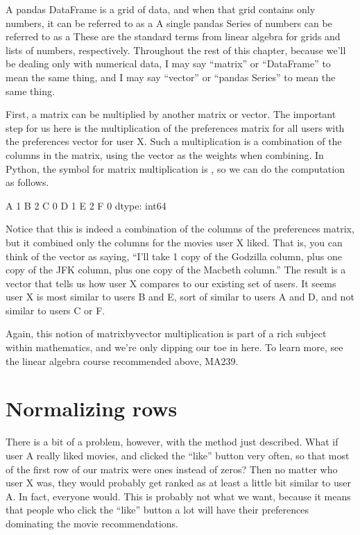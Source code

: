 \documentclass[letterpaper,10pt,english]{sphinxmanual}
\begin{document}
A pandas DataFrame is a grid of data, and when that grid contains only numbers, it can be referred to as a   A single pandas Series of numbers can be referred to as a   These are the standard terms from linear algebra for grids and lists of numbers, respectively.  Throughout the rest of this chapter, because we’ll be dealing only with numerical data, I may say “matrix” or “DataFrame” to mean the same thing, and I may say “vector” or “pandas Series” to mean the same thing.

First, a matrix can be multiplied by another matrix or vector.  The important step for us here is the multiplication of the preferences matrix for all users with the preferences vector for user X.  Such a multiplication is a combination of the columns in the matrix, using the vector as the weights when combining.  In Python, the symbol for matrix multiplication is , so we can do the computation as follows.

\begin{sphinxVerbatim}[commandchars=\\\{\}]
  
\end{sphinxVerbatim}

\begin{sphinxVerbatim}[commandchars=\\\{\}]
A    1
B    2
C    0
D    1
E    2
F    0
dtype: int64
\end{sphinxVerbatim}

Notice that this is indeed a combination of the columns of the preferences matrix, but it combined only the columns for the movies user X liked.  That is, you can think of the  vector as saying, “I’ll take 1 copy of the Godzilla column, plus one copy of the JFK column, plus one copy of the Macbeth column.”  The result is a vector that tells us how user X compares to our existing set of users.  It seems user X is most similar to users B and E, sort of similar to users A and D, and not similar to users C or F.

Again, this notion of matrix\sphinxhyphen{}by\sphinxhyphen{}vector multiplication is part of a rich subject within mathematics, and we’re only dipping our toe in here.  To learn more, see the linear algebra course recommended above, MA239.


\section{Normalizing rows}
\label{\detokenize{chapter-16-matrices:normalizing-rows}}
There is a bit of a problem, however, with the method just described.  What if user A really liked movies, and clicked the “like” button very often, so that most of the first row of our matrix were ones instead of zeros?  Then no matter who user X was, they would probably get ranked as at least a little bit similar to user A.  In fact, everyone would.  This is probably not what we want, because it means that people who click the “like” button a lot will have their preferences dominating the movie recommendations.
\end{document}
